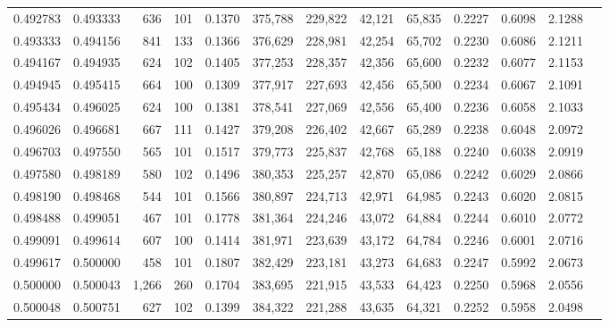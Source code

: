 \begin{tabular}{rrrrrrrrrrrrr}
0.492783 & 0.493333 &    636 &   101 &                                     0.1370 & 375,788 & 229,822 &  42,121 &  65,835 & 0.2227 & 0.6098 & 2.1288 \\
0.493333 & 0.494156 &    841 &   133 &                                     0.1366 & 376,629 & 228,981 &  42,254 &  65,702 & 0.2230 & 0.6086 & 2.1211 \\
0.494167 & 0.494935 &    624 &   102 &                                     0.1405 & 377,253 & 228,357 &  42,356 &  65,600 & 0.2232 & 0.6077 & 2.1153 \\
0.494945 & 0.495415 &    664 &   100 &                                     0.1309 & 377,917 & 227,693 &  42,456 &  65,500 & 0.2234 & 0.6067 & 2.1091 \\
0.495434 & 0.496025 &    624 &   100 &                                     0.1381 & 378,541 & 227,069 &  42,556 &  65,400 & 0.2236 & 0.6058 & 2.1033 \\
0.496026 & 0.496681 &    667 &   111 &                                     0.1427 & 379,208 & 226,402 &  42,667 &  65,289 & 0.2238 & 0.6048 & 2.0972 \\
0.496703 & 0.497550 &    565 &   101 &                                     0.1517 & 379,773 & 225,837 &  42,768 &  65,188 & 0.2240 & 0.6038 & 2.0919 \\
0.497580 & 0.498189 &    580 &   102 &                                     0.1496 & 380,353 & 225,257 &  42,870 &  65,086 & 0.2242 & 0.6029 & 2.0866 \\
0.498190 & 0.498468 &    544 &   101 &                                     0.1566 & 380,897 & 224,713 &  42,971 &  64,985 & 0.2243 & 0.6020 & 2.0815 \\
0.498488 & 0.499051 &    467 &   101 &                                     0.1778 & 381,364 & 224,246 &  43,072 &  64,884 & 0.2244 & 0.6010 & 2.0772 \\
0.499091 & 0.499614 &    607 &   100 &                                     0.1414 & 381,971 & 223,639 &  43,172 &  64,784 & 0.2246 & 0.6001 & 2.0716 \\
0.499617 & 0.500000 &    458 &   101 &                                     0.1807 & 382,429 & 223,181 &  43,273 &  64,683 & 0.2247 & 0.5992 & 2.0673 \\
0.500000 & 0.500043 &  1,266 &   260 &                                     0.1704 & 383,695 & 221,915 &  43,533 &  64,423 & 0.2250 & 0.5968 & 2.0556 \\
0.500048 & 0.500751 &    627 &   102 &                                     0.1399 & 384,322 & 221,288 &  43,635 &  64,321 & 0.2252 & 0.5958 & 2.0498 \\

\end{tabular}
